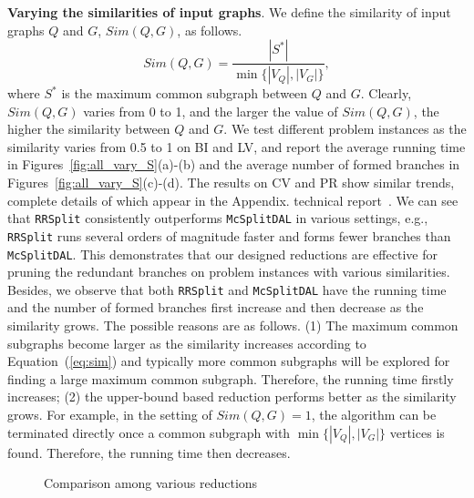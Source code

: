 \smallskip
\noindent\textbf{Varying the similarities of  input graphs}. We define the similarity of  input graphs $Q$ and $G$, $Sim(Q,G)$, as follows.
\begin{equation}
\label{eq:sim}
    Sim(Q,G)=\frac{|S^*|}{\min\{|V_Q|,|V_G|\}},
\end{equation}
where $S^*$ is the maximum common subgraph between $Q$ and $G$. Clearly, $Sim(Q,G)$ varies from 0 to 1, and the larger the value of $Sim(Q,G)$, the higher the similarity between $Q$ and $G$. We test different problem instances as the similarity varies from 0.5 to 1 on \textsf{BI} and \textsf{LV}, and report the average running time in Figures~\ref{fig:all_vary_S}(a)-(b) and the average number of formed branches in Figures~\ref{fig:all_vary_S}(c)-(d). {\Yui The results on \textsf{CV} and \textsf{PR} show similar trends, complete details of which appear in the 
\ifx \CR\undefined
Appendix. 
\else
technical report~\cite{TR}. 
\fi
}  We can see that \texttt{RRSplit} consistently outperforms \texttt{McSplitDAL} {\chengC in} various settings, e.g., \texttt{RRSplit} runs several orders of magnitude faster and forms fewer branches than \texttt{McSplitDAL}. This demonstrates that our designed reductions are effective for pruning the redundant branches on problem instances with various similarities. Besides, we observe that both \texttt{RRSplit} and \texttt{McSplitDAL} have the running time and the number of formed branches first increase and then decrease as the similarity grows. {\revision The possible reasons are as follows. (1) The maximum common subgraphs become larger as the similarity increases according to Equation~(\ref{eq:sim}) and typically more common subgraphs will be explored for finding a large maximum common subgraph. Therefore, the running time firstly increases; (2) the upper-bound based reduction {\chengE performs} better as the similarity grows. {\chengE For example, in the setting of} $Sim(Q,G)=1$, the algorithm can be terminated directly once a common subgraph with $\min\{|V_Q|,|V_G|\}$ vertices is found. Therefore, the running time then decreases.}



\begin{figure}[]
        \vspace{-0.15in}
	\caption{Comparison among various reductions}
	\label{fig:all_vary_R}
\end{figure}

